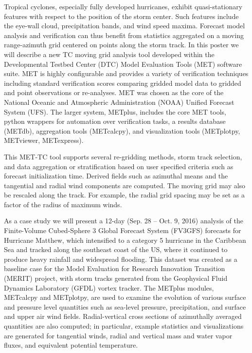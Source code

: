 Tropical cyclones, especially fully developed hurricanes,
exhibit quasi-stationary features with respect to the position of the storm center.
Such features include the eye-wall cloud, precipitation bands, and wind speed maxima.
Forecast model analysis and verification can thus benefit from statistics
aggregated on a moving range-azimuth grid centered on points along the storm track.
In this poster we will describe a new TC moving grid analysis tool
developed within the Developmental Testbed Center (DTC)
Model Evaluation Tools (MET) software suite.
MET is highly configurable and provides a variety of verification techniques
including standard verification scores comparing gridded model data
to gridded and point observations or re-analyses.
MET was chosen as the core of the National Oceanic and Atmospheric Administration (NOAA)
Unified Forecast System (UFS).
The larger system, METplus, includes the core MET tools,
python wrappers for automation over verification tasks,
a results database (METdb),
aggregation tools (METcalcpy),
and visualization tools (METplotpy, METviewer, METexpress).
\newline

This MET-TC tool supports several re-gridding methods,
storm track selection, and data aggregation or stratification based
on user specified criteria such as forecast initialization time.
Derived fields such as azimuthal means and the tangential
and radial wind components are computed.
The moving grid may also be rescaled along the track.
For example, the radial grid spacing may be set
as a factor of the radius of maximum winds.
\newline

As a case study we will present a 12-day (Sep. 28 – Oct. 9, 2016) analysis
of the Finite-Volume Cubed-Sphere 3 Global Forecast System (FV3GFS) forecasts
for Hurricane Matthew,
which intensified to a category 5 hurricane in the Caribbean Sea
and tracked along the southeast coast of the US,
where it continued to produce heavy rainfall and widespread flooding.
This dataset was created as a baseline case
for the Model Evaluation for Research Innovation Transition (MERIT) project,
with storm tracks generated from the Geophysical Fluid Dynamics Laboratory (GFDL)
vortex tracker.
The METplus modules, METcalcpy and METplotpy,
are used to examine the evolution of various surface
and pressure level quantities such as sea-level pressure,
precipitation, and surface and upper air wind fields.
Radial-vertical cross sections of azimuthally averaged quantities are also computed;
in particular, example statistics
and visualizations are generated for tangential winds,
radial and vertical mass and water vapor fluxes,
and equivalent potential temperature.
